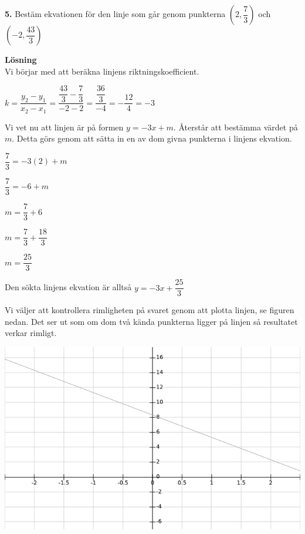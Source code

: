 \documentclass{article}
\begin{document}
\textbf{5.} Bestäm ekvationen för den linje som går genom punkterna $(2,\dfrac{7}{3})$ och $(-2,\dfrac{43}{3})$

\textbf{Lösning}\\
Vi börjar med att beräkna linjens riktningskoefficient.

$k=\dfrac{y_{2}-y_{1}}{x_{2}-x_{1}}=\dfrac{\dfrac{43}{3}-\dfrac{7}{3}}{-2-2}=\dfrac{\dfrac{36}{3}}{-4}=-\dfrac{12}{4}=-3$

Vi vet nu att linjen är på formen $y=-3x+m$. Återstår att bestämma värdet på $m$. Detta görs genom att sätta in en av dom givna punkterna i linjens ekvation.

$\dfrac{7}{3}=-3(2)+m$

$\dfrac{7}{3}=-6+m$

$m=\dfrac{7}{3}+6$

$m=\dfrac{7}{3}+\dfrac{18}{3}$

$m=\dfrac{25}{3}$

Den sökta linjens ekvation är alltså $y=-3x+\dfrac{25}{3}$

Vi väljer att kontrollera rimligheten på svaret genom att plotta linjen, se figuren nedan. Det ser ut som om dom två kända punkterna ligger på linjen så resultatet verkar rimligt.

\includegraphics[scale=0.65]{graph_1_5_1.png}
\end{document}
